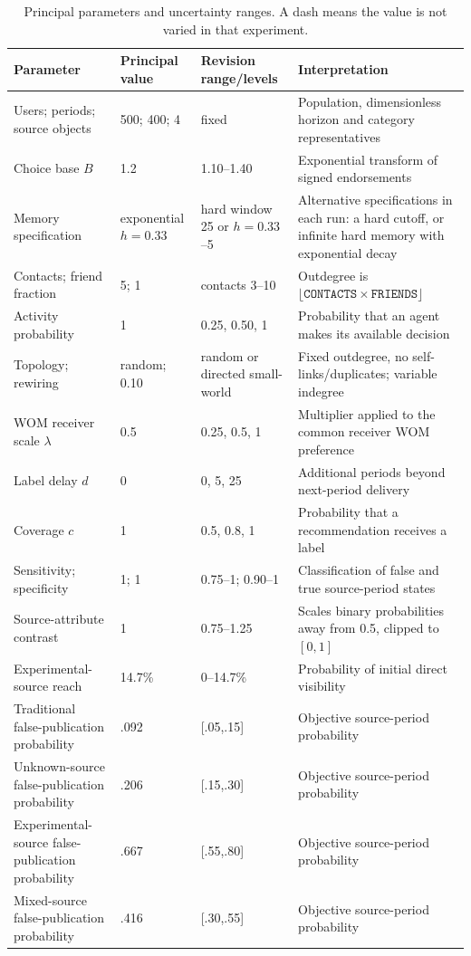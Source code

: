 \begin{table}[ht]
\centering
\caption{Principal parameters and uncertainty ranges. A dash means the value is not varied in that experiment.}
\label{tab:parameters}
\small
\begin{tabular}{p{3.4cm}p{2.1cm}p{3.2cm}p{6.2cm}}
\toprule
Parameter & Principal value & Revision range/levels & Interpretation \\
\midrule
Users; periods; source objects & 500; 400; 4 & fixed & Population, dimensionless horizon and category representatives \\
Choice base $B$ & 1.2 & 1.10--1.40 & Exponential transform of signed endorsements \\
Memory specification & exponential $h=0.33$ & hard window 25 or $h=0.33$--5 & Alternative specifications in each run: a hard cutoff, or infinite hard memory with exponential decay \\
Contacts; friend fraction & 5; 1 & contacts 3--10 & Outdegree is $\lfloor\texttt{CONTACTS}\times\texttt{FRIENDS}\rfloor$ \\
Activity probability & 1 & 0.25, 0.50, 1 & Probability that an agent makes its available decision \\
Topology; rewiring & random; 0.10 & random or directed small-world & Fixed outdegree, no self-links/duplicates; variable indegree \\
WOM receiver scale $\lambda$ & 0.5 & 0.25, 0.5, 1 & Multiplier applied to the common receiver WOM preference \\
Label delay $d$ & 0 & 0, 5, 25 & Additional periods beyond next-period delivery \\
Coverage $c$ & 1 & 0.5, 0.8, 1 & Probability that a recommendation receives a label \\
Sensitivity; specificity & 1; 1 & 0.75--1; 0.90--1 & Classification of false and true source-period states \\
Source-attribute contrast & 1 & 0.75--1.25 & Scales binary probabilities away from 0.5, clipped to $[0,1]$ \\
Experimental-source reach & 14.7\% & 0--14.7\% & Probability of initial direct visibility \\
Traditional false-publication probability & .092 & [.05,.15] & Objective source-period probability \\
Unknown-source false-publication probability & .206 & [.15,.30] & Objective source-period probability \\
Experimental-source false-publication probability & .667 & [.55,.80] & Objective source-period probability \\
Mixed-source false-publication probability & .416 & [.30,.55] & Objective source-period probability \\
\bottomrule
\end{tabular}
\end{table}
